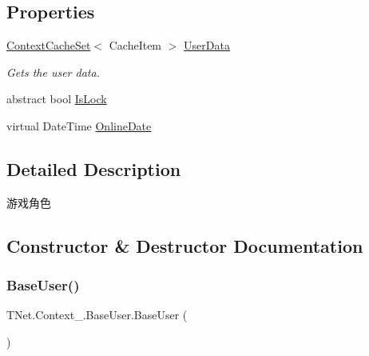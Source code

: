 \subsection*{Properties}
\begin{DoxyCompactItemize}
\item 
\mbox{\hyperlink{class_t_net_1_1_cache_1_1_context_cache_set}{Context\+Cache\+Set}}$<$ Cache\+Item $>$ \mbox{\hyperlink{class_t_net_1_1_context___1_1_base_user_a3c5485f11e33b39bacfa71807e3ddee3}{User\+Data}}
\begin{DoxyCompactList}\small\item\em Gets the user data. \end{DoxyCompactList}\item 
abstract bool \mbox{\hyperlink{class_t_net_1_1_context___1_1_base_user_af362cd408f3d27d3de17b23595632289}{Is\+Lock}}
\item 
virtual Date\+Time \mbox{\hyperlink{class_t_net_1_1_context___1_1_base_user_a76b999d6225f21ec472feb7ac0b6287f}{Online\+Date}}
\end{DoxyCompactItemize}


\subsection{Detailed Description}
游戏角色 



\subsection{Constructor \& Destructor Documentation}
\mbox{\label{class_t_net_1_1_context___1_1_base_user_a63324111892807f2154d8f2f66ed7dfe}} 
\subsubsection{\texorpdfstring{Base\+User()}{BaseUser()}\hspace{0.1cm}{\footnotesize\ttfamily [1/2]}}
{\footnotesize\ttfamily T\+Net.\+Context\+\_\+.\+Base\+User.\+Base\+User (\begin{DoxyParamCaption}{ }\end{DoxyParamCaption})\hspace{0.3cm}{\ttfamily [protected]}}



